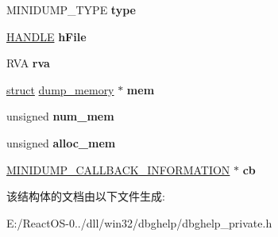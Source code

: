 \begin{DoxyCompactItemize}
M\+I\+N\+I\+D\+U\+M\+P\+\_\+\+T\+Y\+PE {\bfseries type}
\item 
\mbox{\label{structdump__context_a68faf69c96d37be4d00cbffa5a7bd04b}} 
\hyperlink{interfacevoid}{H\+A\+N\+D\+LE} {\bfseries h\+File}
\item 
\mbox{\label{structdump__context_a5ba33cf597350e97708ac4a323196197}} 
R\+VA {\bfseries rva}
\item 
\mbox{\label{structdump__context_a00a0edcecf49dfd0d710f8851de3b16a}} 
\hyperlink{interfacestruct}{struct} \hyperlink{structdump__memory}{dump\+\_\+memory} $\ast$ {\bfseries mem}
\item 
\mbox{\label{structdump__context_a7f4c95f72a09aaf4c67794690f90bcba}} 
unsigned {\bfseries num\+\_\+mem}
\item 
\mbox{\label{structdump__context_a873b926b2ce989a4bda9954ad293b67c}} 
unsigned {\bfseries alloc\+\_\+mem}
\item 
\mbox{\label{structdump__context_ad92bb601f01fec7b63d91d5157cd0a62}} 
\hyperlink{struct___m_i_n_i_d_u_m_p___c_a_l_l_b_a_c_k___i_n_f_o_r_m_a_t_i_o_n}{M\+I\+N\+I\+D\+U\+M\+P\+\_\+\+C\+A\+L\+L\+B\+A\+C\+K\+\_\+\+I\+N\+F\+O\+R\+M\+A\+T\+I\+ON} $\ast$ {\bfseries cb}
\end{DoxyCompactItemize}


该结构体的文档由以下文件生成\+:\begin{DoxyCompactItemize}
\item 
E\+:/\+React\+O\+S-\/0../dll/win32/dbghelp/dbghelp\+\_\+private.\+h\end{DoxyCompactItemize}
